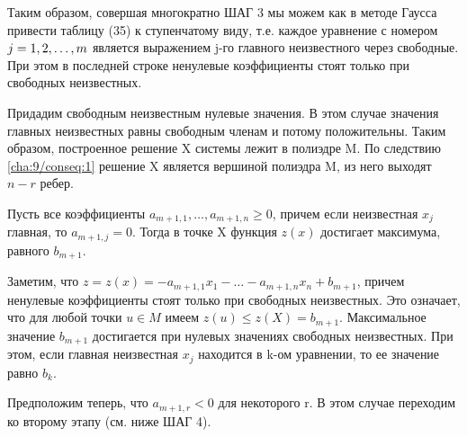 Таким образом, совершая многократно ШАГ 3 мы можем как в методе Гаусса привести таблицу (35) к ступенчатому виду, т.е. каждое уравнение с номером $j = 1,2,\dots,m$ является выражением j-го главного неизвестного через свободные. При этом в последней строке ненулевые коэффициенты стоят только при свободных неизвестных.

Придадим свободным неизвестным нулевые значения. В этом случае значения главных неизвестных равны свободным членам и потому положительны. Таким образом, построенное решение X системы лежит в полиэдре M. По следствию \ref{cha:9/conseq:1} решение X является вершиной полиэдра M, из него выходят $n − r$ ребер.

\begin{propose}\label{cha:14/propose:2}
	Пусть все коэффициенты $a_{m+1,1}, \dots, a_{m+1,n} \ge 0$, причем если неизвестная $x_j$ главная, то $a_{m+1,j} = 0$. Тогда в точке X функция $z(x)$ достигает максимума, равного $b_{m+1}$.
\end{propose}
\begin{Proof}
	Заметим, что $z = z(x) = -a_{m+1,1}x_1 - \dots - a_{m+1,n}x_n + b_{m+1}$, причем ненулевые коэффициенты стоят только при свободных неизвестных. Это означает, что для любой точки $u \in M$ имеем $z(u) \le z(X) = b_{m+1}$. Максимальное значение $b_{m+1}$ достигается при нулевых значениях свободных неизвестных. При этом, если главная неизвестная $x_j$ находится в k-ом уравнении, то ее значение равно $b_k$.
\end{Proof}

Предположим теперь, что $a_{m+1,r} < 0$ для некоторого r. В этом случае переходим ко второму этапу (см. ниже ШАГ 4).




